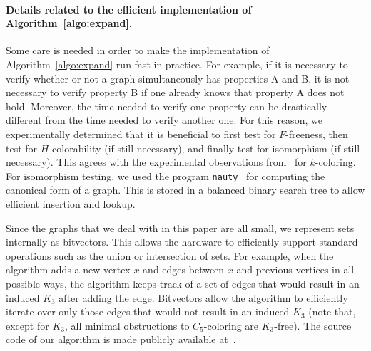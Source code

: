 \documentclass[11pt,a4paper]{article}
\theoremstyle{mystyle}
\begin{document}
\paragraph{Details related to the efficient implementation of Algorithm~\ref{algo:expand}.}\label{sec:app1}
Some care is needed in order to make the implementation of Algorithm~\ref{algo:expand} run fast in practice. For example, if it is necessary to verify whether or not a graph simultaneously has properties A and B, it is not necessary to verify property B if one already knows that property A does not hold. Moreover, the time needed to verify one property can be drastically different from the time needed to verify another one. For this reason, we experimentally determined that it is beneficial to first test for $F$-freeness, then test for $H$-colorability (if still necessary), and finally test for isomorphism (if still necessary). This agrees with the experimental observations from~\cite{DBLP:journals/jgt/GoedgebeurS18} for $k$-coloring. For isomorphism testing, we used the program \texttt{nauty}~\cite{DBLP:journals/jsc/McKayP14} for computing the canonical form of a graph. This is stored in a balanced binary search tree to allow efficient insertion and lookup.

Since the graphs that we deal with in this paper are all small, we represent sets internally as bitvectors. This allows the hardware to efficiently support standard operations such as the union or intersection of sets. For example, when the algorithm adds a new vertex $x$ and edges between $x$ and previous vertices in all possible ways, the algorithm keeps track of a set of edges that would result in an induced $K_3$ after adding the edge. Bitvectors allow the algorithm to efficiently iterate over only those edges that would not result in an induced $K_3$ (note that, except for $K_3$, all minimal obstructions to $C_5$-coloring are $K_3$-free). The source code of our algorithm is made publicly available at~\cite{gitrepo}.
\end{document}
